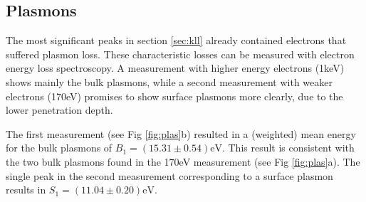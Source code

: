 \documentclass[a4paper]{scrartcl}
\numberwithin{equation}{section}
\numberwithin{figure}{section}
\numberwithin{table}{section}
\begin{document}
\FloatBarrier




\subsection{Plasmons}
\label{sec:plas}
The most significant peaks in section \ref{sec:kll} already contained electrons that suffered plasmon loss. These characteristic losses can be measured with electron energy loss spectroscopy. A measurement with higher energy electrons (1keV) shows mainly the bulk plasmons, while a second measurement with weaker electrons (170eV) promises to show surface plasmons more clearly, due to the lower penetration depth.


The first measurement (see Fig \ref{fig:plas}b) resulted in a (weighted) mean energy for the bulk plasmons of $B_1 = (15.31\pm 0.54)\text{eV}$. This result is consistent with the two bulk plasmons found in the 170eV measurement (see Fig \ref{fig:plas}a). The single peak in the second measurement corresponding to a surface plasmon results in $S_1 = (11.04\pm 0.20)\text{eV}$. 
\end{document}
